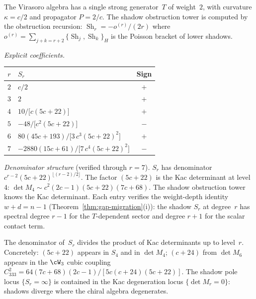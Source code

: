 \begin{computation}%
\label{comp:virasoro-shadow-tower}%
%
The Virasoro algebra has a single strong generator~$T$ of
weight~$2$, with curvature $\kappa = c/2$ and
propagator $P = 2/c$. The shadow obstruction tower is computed by
the obstruction recursion: $\operatorname{Sh}_r =
-o^{(r)}/(2r)$ where $o^{(r)} = \sum_{j+k=r+2}
\{\operatorname{Sh}_j, \operatorname{Sh}_k\}_H$ is the
Poisson bracket of lower shadows.

\smallskip
\noindent
\emph{Explicit coefficients.}
\begin{center}
\small
\renewcommand{\arraystretch}{1.2}
\begin{tabular}{clc}
\toprule
$r$ & $S_r$ & Sign \\
\midrule
$2$ & $c/2$ & $+$ \\
$3$ & $2$ & $+$ \\
$4$ & $10/\bigl[c(5c{+}22)\bigr]$ & $+$ \\
$5$ & $-48/\bigl[c^2(5c{+}22)\bigr]$ & $-$ \\
$6$ & $80(45c{+}193)/\bigl[3\,c^3(5c{+}22)^2\bigr]$ & $+$ \\
$7$ & $-2880(15c{+}61)/\bigl[7\,c^4(5c{+}22)^2\bigr]$ & $-$ \\
\bottomrule
\end{tabular}
\end{center}

\emph{Denominator structure} \textup{(}verified through
$r = 7$\textup{)}\emph{.}
$S_r$ has denominator $c^{r-2}(5c{+}22)^{\lfloor(r-2)/2\rfloor}$.
The factor $(5c{+}22)$ is the Kac determinant at level~$4$:
$\det M_4 \sim c^2(2c{-}1)(5c{+}22)(7c{+}68)$. The shadow obstruction tower
knows the Kac determinant.
Each entry verifies the weight-depth identity $w + d = n - 1$ (Theorem~\ref{thm:gap-migration}(i)): the shadow $S_r$ at degree~$r$ has spectral degree $r - 1$ for the $T$-dependent sector and degree $r + 1$ for the scalar contact term.
\end{computation}

\begin{remark}%
\label{rem:kac-shadow-singularity}%
%
%
The denominator of~$S_r$ divides the product of Kac
determinants up to level~$r$. Concretely:
$(5c+22)$ appears in $S_4$ and in $\det M_4$;
$(c+24)$ from $\det M_6$ appears in the $\cW_3$ cubic
coupling $C_{333}^2 = 64(7c+68)(2c-1)/[5c(c+24)(5c+22)]$.
The shadow pole locus $\{S_r = \infty\}$ is contained in the
Kac degeneration locus $\{\det M_r = 0\}$: shadows diverge
where the chiral algebra degenerates.
\end{remark}

